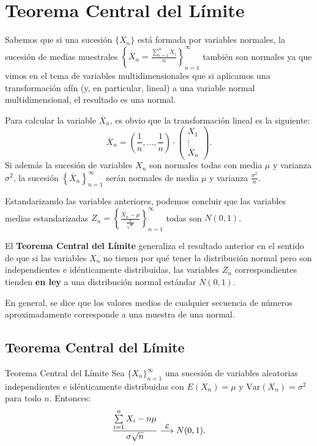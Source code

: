 \documentclass[
  letterpaper,
  DIV=11,
  numbers=noendperiod]{scrreprt}
\begin{document}
\hypertarget{teorema-central-del-luxedmite}{%
\section{Teorema Central del
Límite}\label{teorema-central-del-luxedmite}}

Sabemos que si una sucesión \(\{X_n\}\) está formada por variables
normales, la sucesión de medias muestrales
\(\left\{\overline{X}_n=\frac{\sum\limits_{i=1}^n X_i}{n}\right\}_{n=1}^\infty\)
también son normales ya que vimos en el tema de variables
multidimensionales que si aplicamos una transformación afín (y, en
particular, lineal) a una variable normal multidimensional, el resultado
es una normal.

Para calcular la variable \(\overline{X}_n\), es obvio que la
transformación lineal es la siguiente: \[
\overline{X}_n = \left(\frac{1}{n},\ldots,\frac{1}{n}\right)\cdot \begin{pmatrix}X_1 \\\vdots\\ X_n\end{pmatrix}.
\] Si además la sucesión de variables \(X_n\) son normales todas con
media \(\mu\) y varianza \(\sigma^2\), la sucesión
\(\left\{\overline{X}_n\right\}_{n=1}^\infty\) serán normales de media
\(\mu\) y varianza \(\frac{\sigma^2}{n}\).

Estandarizando las variables anteriores, podemos concluir que las
variables medias estandarizadas
\(Z_n =\left\{\frac{\overline{X}_n-\mu}{\frac{\sigma}{\sqrt{n}}}\right\}_{n=1}^\infty\)
todas son \(N(0,1)\).

El \textbf{Teorema Central del Límite} generaliza el resultado anterior
en el sentido de que si las variables \(X_n\) no tienen por qué tener la
distribución normal pero son independientes e idénticamente
distribuidas, las variables \(Z_n\) correspondientes tienden \textbf{en
ley} a una distribución normal estándar \(N(0,1)\).

En general, se dice que los valores medios de cualquier secuencia de
números aproximadamente corresponde a una muestra de una normal.

\hypertarget{teorema-central-del-luxedmite-1}{%
\subsection{Teorema Central del
Límite}\label{teorema-central-del-luxedmite-1}}

Teorema Central del Límite Sea \(\{X_n\}_{n=1}^\infty\) una sucesión de
variables aleatorias independientes e idénticamente distribuidas con
\(E(X_n)=\mu\) y \(\mathrm{Var}(X_n)=\sigma^2\) para todo \(n\).
Entonces: \[
\frac{\sum\limits_{i=1}^n X_i-n\mu}{\sigma\sqrt{n}}\stackrel{{\cal L}}{\longrightarrow} N(0,1).
\]
\end{document}
